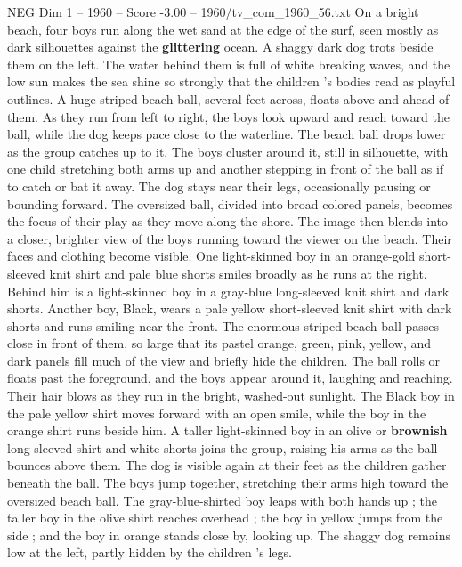 \begin{textsample}{NEG Dim 1 – 1960 – Score -3.00 – 1960/tv\_com\_1960\_56.txt}  \label{ex:f1_neg_025}
On a bright beach, four boys run along the wet sand at the edge of the surf, seen mostly as dark silhouettes against the \textbf{glittering} ocean.
A shaggy dark dog trots beside them on the left.
The water behind them is full of white breaking waves, and the low sun makes the sea shine so strongly that the children ’s bodies read as playful outlines.
A huge striped beach ball, several feet across, floats above and ahead of them.
As they run from left to right, the boys look upward and reach toward the ball, while the dog keeps pace close to the waterline.
The beach ball drops lower as the group catches up to it.
The boys cluster around it, still in silhouette, with one child stretching both arms up and another stepping in front of the ball as if to catch or bat it away.
The dog stays near their legs, occasionally pausing or bounding forward.
The oversized ball, divided into broad colored panels, becomes the focus of their play as they move along the shore.
The image then blends into a closer, brighter view of the boys running toward the viewer on the beach.
Their faces and clothing become visible.
One light-skinned boy in an orange-gold short-sleeved knit shirt and pale blue shorts smiles broadly as he runs at the right.
Behind him is a light-skinned boy in a gray-blue long-sleeved knit shirt and dark shorts.
Another boy, Black, wears a pale yellow short-sleeved knit shirt with dark shorts and runs smiling near the front.
The enormous striped beach ball passes close in front of them, so large that its pastel orange, green, pink, yellow, and dark panels fill much of the view and briefly hide the children.
The ball rolls or floats past the foreground, and the boys appear around it, laughing and reaching.
Their hair blows as they run in the bright, washed-out sunlight.
The Black boy in the pale yellow shirt moves forward with an open smile, while the boy in the orange shirt runs beside him.
A taller light-skinned boy in an olive or \textbf{brownish} long-sleeved shirt and white shorts joins the group, raising his arms as the ball bounces above them.
The dog is visible again at their feet as the children gather beneath the ball.
The boys jump together, stretching their arms high toward the oversized beach ball.
The gray-blue-shirted boy leaps with both hands up ; the taller boy in the olive shirt reaches overhead ; the boy in yellow jumps from the side ; and the boy in orange stands close by, looking up.
The shaggy dog remains low at the left, partly hidden by the children ’s legs.

\end{textsample}
